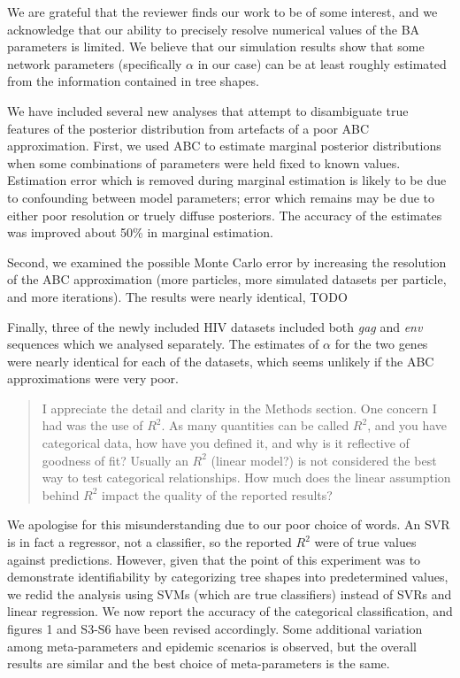 \documentclass[12pt]{letter}
\begin{document}
\begin{letter}{ }
We are grateful that the reviewer finds our work to be of some interest, and we
acknowledge that our ability to precisely resolve numerical values of the BA
parameters is limited. We believe that our simulation results show that some
network parameters (specifically $\alpha$ in our case) can be at least roughly
estimated from the information contained in tree shapes.

We have included several new analyses that attempt to disambiguate true
features of the posterior distribution from artefacts of a poor ABC
approximation. First, we used ABC to estimate marginal posterior distributions
when some combinations of parameters were held fixed to known values.
Estimation error which is removed during marginal estimation is likely to be
due to confounding between model parameters; error which remains may be due to
either poor resolution or truely diffuse posteriors. The accuracy of the
estimates was improved about 50\% in marginal estimation.

Second, we examined the possible Monte Carlo error by increasing the resolution
of the ABC approximation (more particles, more simulated datasets per particle,
and more iterations). The results were nearly identical, TODO

Finally, three of the newly included HIV datasets included both \textit{gag}
and \textit{env} sequences which we analysed separately. The estimates of
$\alpha$ for the two genes were nearly identical for each of the datasets,
which seems unlikely if the ABC approximations were very poor.

\begin{quote}
  \itshape

  I appreciate the detail and clarity in the Methods section. One concern I had
  was the use of $R^2$. As many quantities can be called $R^2$, and you have
  categorical data, how have you defined it, and why is it reflective of
  goodness of fit? Usually an $R^2$ (linear model?) is not considered the best
  way to test categorical relationships. How much does the linear assumption
  behind $R^2$ impact the quality of the reported results?
\end{quote}

We apologise for this misunderstanding due to our poor choice of words. An SVR
is in fact a regressor, not a classifier, so the reported $R^2$ were of true
values against predictions. However, given that the point of this experiment
was to demonstrate identifiability by categorizing tree shapes into
predetermined values, we redid the analysis using SVMs (which are true
classifiers) instead of SVRs and linear regression. We now report the accuracy
of the categorical classification, and figures 1 and S3-S6 have been revised
accordingly. Some additional variation among meta-parameters and epidemic
scenarios is observed, but the overall results are similar and the best choice
of meta-parameters is the same.


\end{letter}
\end{document}
